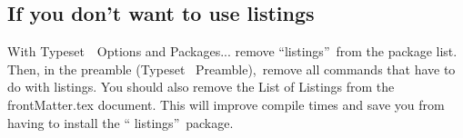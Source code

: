 \subsection{If you don't want to use listings}

With Typeset\ \TEXTsymbol{>}\TEXTsymbol{>}\ Options and Packages... remove
\textquotedblleft listings\textquotedblright\ from the package list. Then,
in the preamble (Typeset \TEXTsymbol{>}\TEXTsymbol{>}\ Preamble),\ remove
all commands that have to do with listings. You should also remove the List
of Listings from the frontMatter.tex document. This will improve compile
times and save you from having to install the \textquotedblleft
listings\textquotedblright\ package.
